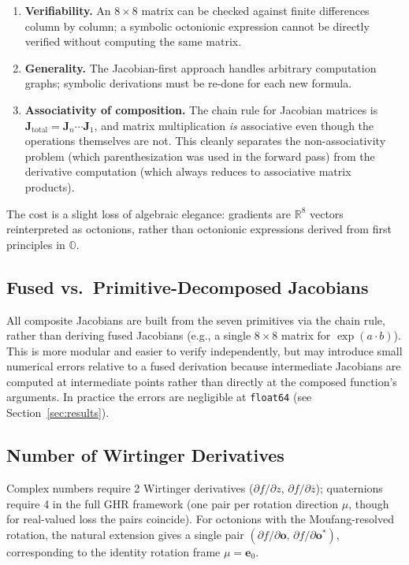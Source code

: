 \documentclass[11pt]{article}
\newcommand{\OO}{\mathbb{O}}
\newcommand{\RR}{\mathbb{R}}
\newcommand{\ee}[1]{\mathbf{e}_{#1}}
\newcommand{\conj}[1]{\overline{#1}}
\begin{document}
\begin{enumerate}
  \item \textbf{Verifiability.}  An $8\times 8$ matrix can be checked against
        finite differences column by column; a symbolic octonionic expression
        cannot be directly verified without computing the same matrix.
  \item \textbf{Generality.}  The Jacobian-first approach handles arbitrary
        computation graphs; symbolic derivations must be re-done for each
        new formula.
  \item \textbf{Associativity of composition.}  The chain rule for Jacobian
        matrices is $\mathbf{J}_\text{total} = \mathbf{J}_n \cdots \mathbf{J}_1$,
        and matrix multiplication \emph{is} associative even though the
        operations themselves are not.  This cleanly separates the
        non-associativity problem (which parenthesization was used in the
        forward pass) from the derivative computation (which always reduces to
        associative matrix products).
\end{enumerate}

The cost is a slight loss of algebraic elegance: gradients are $\RR^8$ vectors
reinterpreted as octonions, rather than octonionic expressions derived from
first principles in $\OO$.

\subsection{Fused vs.\ Primitive-Decomposed Jacobians}

All composite Jacobians are built from the seven primitives via the chain rule,
rather than deriving fused Jacobians (e.g., a single $8\times 8$ matrix for
$\exp(a \cdot b)$).  This is more modular and easier to verify independently,
but may introduce small numerical errors relative to a fused derivation because
intermediate Jacobians are computed at intermediate points rather than directly
at the composed function's arguments.  In practice the errors are negligible
at \texttt{float64} (see Section~\ref{sec:results}).

\subsection{Number of Wirtinger Derivatives}

Complex numbers require 2 Wirtinger derivatives
($\partial f/\partial z$, $\partial f/\partial\conj{z}$); quaternions require
4 in the full GHR framework (one pair per rotation direction $\mu$, though for
real-valued loss the pairs coincide).  For octonions with the Moufang-resolved
rotation, the natural extension gives a single pair
$(\partial f/\partial\mathbf{o},\, \partial f/\partial\mathbf{o}^*)$,
corresponding to the identity rotation frame $\mu = \ee{0}$.
\end{document}
